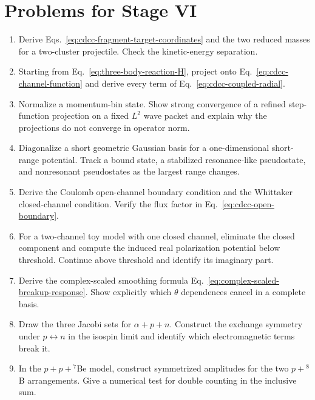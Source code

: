 \section{Problems for Stage VI}
\label{problems:stage-VI}

\begin{enumerate}[label=\textbf{VI.\arabic*},leftmargin=*]
  \item Derive Eqs.~\eqref{eq:cdcc-fragment-target-coordinates} and the two
  reduced masses for a two-cluster projectile.  Check the kinetic-energy
  separation.

  \item Starting from Eq.~\eqref{eq:three-body-reaction-H}, project onto
  Eq.~\eqref{eq:cdcc-channel-function} and derive every term of
  Eq.~\eqref{eq:cdcc-coupled-radial}.

  \item Normalize a momentum-bin state.  Show strong convergence of a refined
  step-function projection on a fixed $L^2$ wave packet and explain why the
  projections do not converge in operator norm.

  \item Diagonalize a short geometric Gaussian basis for a one-dimensional
  short-range potential.  Track a bound state, a stabilized resonance-like
  pseudostate, and nonresonant pseudostates as the largest range changes.

  \item Derive the Coulomb open-channel boundary condition and the Whittaker
  closed-channel condition.  Verify the flux factor in
  Eq.~\eqref{eq:cdcc-open-boundary}.

  \item For a two-channel toy model with one closed channel, eliminate the
  closed component and compute the induced real polarization potential below
  threshold.  Continue above threshold and identify its imaginary part.

  \item Derive the complex-scaled smoothing formula
  Eq.~\eqref{eq:complex-scaled-breakup-response}.  Show explicitly which
  $\theta$ dependences cancel in a complete basis.

  \item Draw the three Jacobi sets for $\alpha+p+n$.  Construct the exchange
  symmetry under $p\leftrightarrow n$ in the isospin limit and identify which
  electromagnetic terms break it.

  \item In the $p+p+{}^7$Be model, construct symmetrized amplitudes for the two
  $p+{}^8$B arrangements.  Give a numerical test for double counting in the
  inclusive sum.


\end{enumerate}
